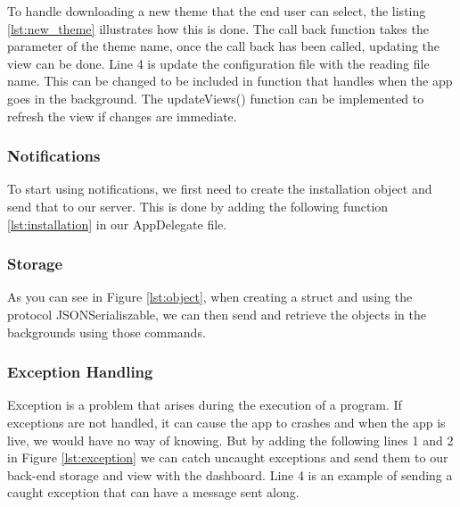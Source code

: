 

To handle downloading a new theme that the end user can select, the listing \ref{lst:new_theme} illustrates how this is done. The call back function takes the parameter of the theme name, once the call back has been called, updating the view can be done. Line 4 is update the configuration file with the reading file name. This can be changed to be included in function that handles when the app goes in the background. The updateViews() function can be implemented to refresh the view if changes are immediate.



\subsubsection{Notifications}
To start using notifications, we first need to create the installation object and send that to our server. This is done by adding the following function \ref{lst:installation} in our AppDelegate file.



\subsubsection{Storage}



As you can see in Figure \ref{lst:object}, when creating a struct and using the protocol JSONSerialiszable, we can then send and retrieve the objects in the backgrounds using those commands.


\subsubsection{Exception Handling}

Exception is a problem that arises during the execution of a program. If exceptions are not handled, it can cause the app to crashes and when the app is live, we would have no way of knowing. But by adding the following lines 1 and 2 in Figure \ref{lst:exception} we can catch uncaught exceptions and send them to our back-end storage and view with the dashboard. Line 4 is an example of sending a caught exception that can have a message sent along.

